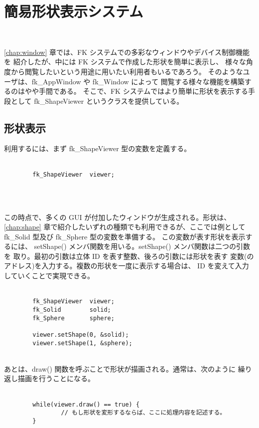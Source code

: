 \chapter{簡易形状表示システム} \label{chap:viewer} ~

\ref{chap:window} 章では、FK システムでの多彩なウィンドウやデバイス制御機能を
紹介したが、中には FK システムで作成した形状を簡単に表示し、
様々な角度から閲覧したいという用途に用いたい利用者もいるであろう。
そのようなユーザは、fk\_AppWindow や fk\_Window によって
閲覧する様々な機能を構築するのはやや手間である。
そこで、FK システムではより簡単に形状を表示する手段として
fk\_ShapeViewer というクラスを提供している。

\section{形状表示}
利用するには、まず fk\_ShapeViewer 型の変数を定義する。\\ ~ \\
\begin{screen}
\begin{verbatim}
        fk_ShapeViewer  viewer;
\end{verbatim}
\end{screen}
\\ ~

この時点で、多くの GUI が付加したウィンドウが生成される。形状は、
\ref{chap:shape} 章で紹介したいずれの種類でも利用できるが、ここでは例として
fk\_Solid 型及び fk\_Sphere 型の変数を準備する。
この変数が表す形状を表示するには、
setShape() メンバ関数を用いる。setShape() メンバ関数は二つの引数を
取り。最初の引数は立体 ID を表す整数、後ろの引数には形状を表す
変数(のアドレス)を入力する。複数の形状を一度に表示する場合は、
ID を変えて入力していくことで実現できる。\\ ~ \\
\begin{breakbox}
\begin{verbatim}
        fk_ShapeViewer  viewer;
        fk_Solid        solid;
        fk_Sphere       sphere;

        viewer.setShape(0, &solid);
        viewer.setShape(1, &sphere);
\end{verbatim}
\end{breakbox}
~ \\

あとは、draw() 関数を呼ぶことで形状が描画される。通常は、次のように
繰り返し描画を行うことになる。\\ ~ \\
\begin{breakbox}
\begin{verbatim}
        while(viewer.draw() == true) {
                // もし形状を変形するならば、ここに処理内容を記述する。
        }
\end{verbatim}
\end{breakbox}
~ \\


